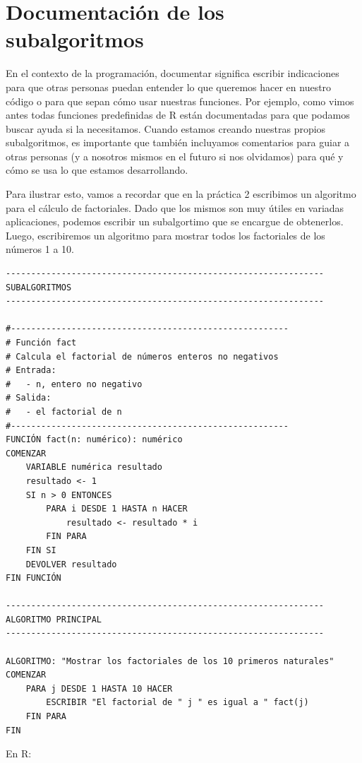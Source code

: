 \documentclass[
]{book}
\begin{document}
\hypertarget{ejemplofact}{%
\section{Documentación de los subalgoritmos}\label{ejemplofact}}

En el contexto de la programación, documentar significa escribir indicaciones para que otras personas puedan entender lo que queremos hacer en nuestro código o para que sepan cómo usar nuestras funciones. Por ejemplo, como vimos antes todas funciones predefinidas de R están documentadas para que podamos buscar ayuda si la necesitamos. Cuando estamos creando nuestras propios subalgoritmos, es importante que también incluyamos comentarios para guiar a otras personas (y a nosotros mismos en el futuro si nos olvidamos) para qué y cómo se usa lo que estamos desarrollando.

Para ilustrar esto, vamos a recordar que en la práctica 2 escribimos un algoritmo para el cálculo de factoriales. Dado que los mismos son muy útiles en variadas aplicaciones, podemos escribir un subalgortimo que se encargue de obtenerlos. Luego, escribiremos un algoritmo para mostrar todos los factoriales de los números 1 a 10.

\begin{verbatim}
---------------------------------------------------------------
SUBALGORITMOS
---------------------------------------------------------------

#-------------------------------------------------------
# Función fact
# Calcula el factorial de números enteros no negativos
# Entrada:
#   - n, entero no negativo
# Salida:
#   - el factorial de n
#-------------------------------------------------------
FUNCIÓN fact(n: numérico): numérico
COMENZAR
    VARIABLE numérica resultado
    resultado <- 1
    SI n > 0 ENTONCES
        PARA i DESDE 1 HASTA n HACER
            resultado <- resultado * i
        FIN PARA
    FIN SI
    DEVOLVER resultado
FIN FUNCIÓN

---------------------------------------------------------------
ALGORITMO PRINCIPAL
---------------------------------------------------------------

ALGORITMO: "Mostrar los factoriales de los 10 primeros naturales"
COMENZAR
    PARA j DESDE 1 HASTA 10 HACER
        ESCRIBIR "El factorial de " j " es igual a " fact(j)
    FIN PARA
FIN
\end{verbatim}

En R:
\end{document}

